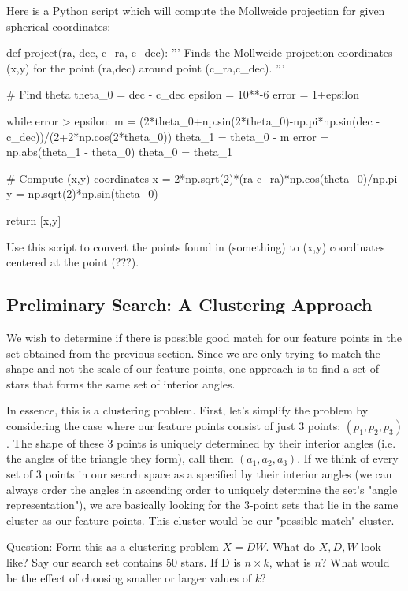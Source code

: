 \documentclass[paper=a4, fontsize=11pt]{scrartcl} %
\begin{document}
Here is a Python script which will compute the Mollweide projection for given spherical coordinates:
\begin{python}

def project(ra, dec, c_ra, c_dec):
	'''
	Finds the Mollweide projection coordinates (x,y) for the point (ra,dec) around 
	point (c_ra,c_dec).
	'''
	
	# Find theta
	theta_0 = dec - c_dec
	epsilon = 10**-6
	error = 1+epsilon
	
	while error > epsilon:
	    m = (2*theta_0+np.sin(2*theta_0)-np.pi*np.sin(dec - c_dec))/(2+2*np.cos(2*theta_0))
	    theta_1 = theta_0 - m
	    error = np.abs(theta_1 - theta_0)
	    theta_0 = theta_1
	
	# Compute (x,y) coordinates
	x = 2*np.sqrt(2)*(ra-c_ra)*np.cos(theta_0)/np.pi
	y = np.sqrt(2)*np.sin(theta_0)
	
	return [x,y]
\end{python}

Use this script to convert the points found in (something) to (x,y) coordinates centered at the point (???).

\subsection{Preliminary Search: A Clustering Approach}
We wish to determine if there is possible good match for our feature points in the set obtained from the previous section.  Since we are only trying to match the shape and not the scale of our feature points, one approach is to find a set of stars that forms the same set of interior angles.

In essence, this is a clustering problem. First, let's simplify the problem by considering the case where our feature points consist of just 3 points: $(p_1,p_2,p_3)$. The shape of these 3 points is uniquely determined by their interior angles (i.e. the angles of the triangle they form), call them $(a_1,a_2,a_3)$. If we think of every set of 3 points in our search space as a specified by their interior angles (we can always order the angles in ascending order to uniquely determine the set's "angle representation"), we are basically looking for the 3-point sets that lie in the same cluster as our feature points. This cluster would be our "possible match" cluster.

Question: Form this as a clustering problem $X = DW$. What do $X,D,W$ look like? Say our search set contains $50$ stars. If D is $n\times k$, what is $n$? What would be the effect of choosing smaller or larger values of $k$?
\end{document}
